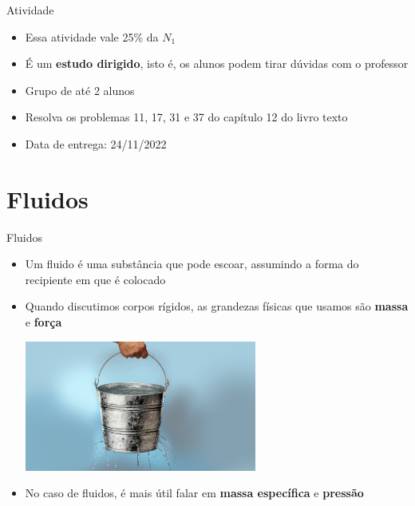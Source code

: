 \begin{frame}{Atividade}

    \begin{itemize}
        \item Essa atividade vale 25\% da \(N_1\)
        \item É um \textbf{estudo dirigido}, isto é, os alunos podem tirar dúvidas com o professor
        \item Grupo de até 2 alunos
        \item Resolva os problemas 11, 17, 31 e 37 do capítulo 12 do livro texto
        \item Data de entrega: 24/11/2022
    \end{itemize}

\end{frame}

\section{Fluidos}

\begin{frame}{Fluidos}
    \begin{itemize}
        \item Um fluido é uma substância que pode escoar, assumindo a forma do recipiente em que é colocado
        \item Quando discutimos corpos rígidos, as grandezas físicas que usamos são \textbf{massa} e \textbf{força}
            \begin{center}
                \includegraphics[width=0.6\textwidth]{images/balde_furado.jpg}
            \end{center}
        \item No caso de fluidos, é mais útil falar em \textbf{massa específica} e \textbf{pressão}
    \end{itemize}
\end{frame}

